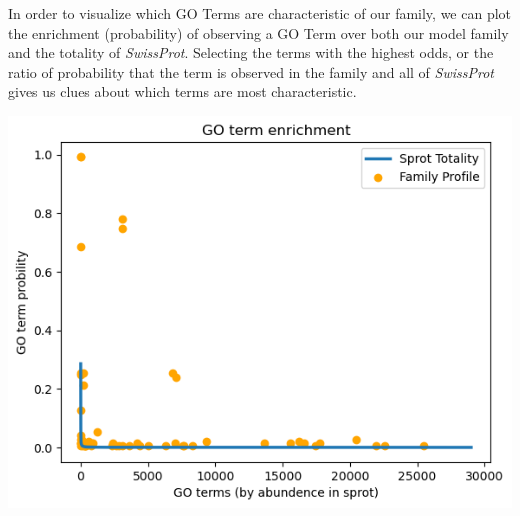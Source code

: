\documentclass[10pt,twocolumn,letterpaper]{article}
\begin{document}
In order to visualize which GO Terms are characteristic of our family, we can plot the enrichment (probability) of observing a GO Term over both our model family and the totality of \textit{SwissProt}. Selecting the terms with the highest odds, or the ratio of probability that the term is observed in the family and all of \textit{SwissProt} gives us clues about which terms are most characteristic. 

\begin{center}
    \includegraphics[scale=0.4]{report/img/go_term_enrichment.png}
\end{center}
\end{document}
